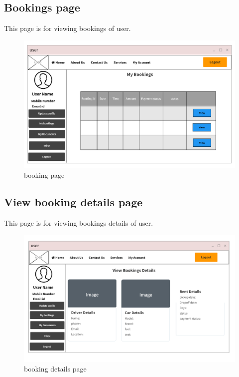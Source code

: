 \documentclass[a4paper,12pt,toc=flat]{report}
\begin{document}
	\pagebreak
	
		\subsection{Bookings page}
\hspace*{12pt}
        This page is for viewing  bookings of user.
	\begin{figure}[bph]
	\begin{center}
		\includegraphics[width=1.1 \linewidth, height=0.7\textheight]{"user_bookings.png"}
	\end{center}
		\caption{ booking page}
	\end{figure}

	\pagebreak
        	
        	
        	\subsection{View booking details page}
\hspace*{12pt}
        This page is for viewing  bookings details  of user.
	\begin{figure}[bph]
	\begin{center}
		\includegraphics[width=1.1 \linewidth, height=0.7\textheight]{"user_booking_details.png"}
	\end{center}
		\caption{ booking details page}
	\end{figure}
\end{document}
